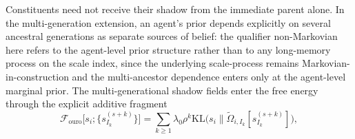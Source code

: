 \documentclass[11pt]{article}
\begin{document}
Constituents need not receive their shadow from the immediate parent alone. In the multi-generation extension, an agent's prior depends explicitly on several ancestral generations as separate sources of belief: the qualifier non-Markovian here refers to the agent-level prior structure rather than to any long-memory process on the scale index, since the underlying scale-process remains Markovian-in-construction and the multi-ancestor dependence enters only at the agent-level marginal prior. The multi-generational shadow fields enter the free energy through the explicit additive fragment
\begin{equation}
\mathcal{F}_{\mathrm{ouro}}\big[s_i; \{s_{I_k}^{(s+k)}\}\big] = \sum_{k \ge 1} \lambda_0 \rho^k \mathrm{KL}\big(s_i \big\| \tilde\Omega_{i,I_k}[s_{I_k}^{(s+k)}]\big),
\label{eq:ouroboros_F}
\end{equation}
\end{document}
